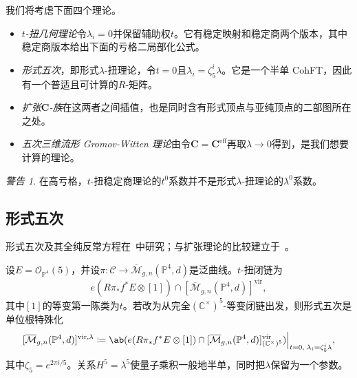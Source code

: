 \documentclass{amsart}
\theoremstyle{definition}
\theoremstyle{remark}
\newtheorem{warn}[thm]{警告}
\theoremstyle{plain}
\theoremstyle{definition}
\theoremstyle{remark}
\newcommand{\C}{\mathbb{C}}
\renewcommand{\P}{\mathbb{P}}
\newcommand{\Mbar}{\overline{\mathcal{M}}}
\newcommand{\mc}[1]{\mathcal{#1}}
\newcommand{\mbf}[1]{\mathbf{#1}}
\newcommand{\mr}[1]{\mathrm{#1}}
\newcommand{\1}{\mathbf{1}}
\newcommand{\2}{\mathbf{2}}
\newcommand{\3}{\mathbf{3}}
\newcommand{\vir}{\mr{vir}}
\begin{document}
我们将考虑下面四个理论。
\begin{itemize}
    \item \textit{\(t\)-扭几何理论}令\(\lambda_i = 0\)并保留辅助权\(t\)。它有稳定映射和稳定商两个版本，其中稳定商版本给出下面的亏格二局部化公式。
    \item \textit{形式五次}，即形式\(\lambda\)-扭理论，令\(t = 0\)且\(\lambda_i = \zeta_5^i \lambda\)。它是一个半单 CohFT，因此有一个普适且可计算的\(R\)-矩阵。
    \item \textit{扩张\(\mbf{C}\)-族}在这两者之间插值，也是同时含有形式顶点与亚纯顶点的二部图所在之处。
    \item \textit{五次三维流形 Gromov-Witten 理论}由令\(\mbf{C} = \mbf{C}^{\mr{eff}}\)再取\(\lambda \to 0\)得到，是我们想要计算的理论。
\end{itemize}

\begin{warn}
    在高亏格，\(t\)-扭稳定商理论的\(t^0\)系数并不是形式\(\lambda\)-扭理论的\(\lambda^0\)系数。
\end{warn}

\subsection{形式五次}%
\label{sub:The formal quintic}

形式五次及其全纯反常方程在~\cite{LhoPandharipande2019}中研究；与扩张理论的比较建立于~\cite{GJRstructure}。

设\(E = \mc{O}_{\P^4}(5)\)，并设\(\pi \colon \mc{C} \to \Mbar_{g,n}(\P^4,d)\)是泛曲线。\(t\)-扭闭链为
\[ e(R\pi_* f^* E \otimes [1]) \cap [\Mbar_{g,n}(\P^4,d)]^{\vir}, \]
其中\([1]\)的等变第一陈类为\(t\)。若改为从完全\((\C^{\times})^5\)-等变闭链出发，则形式五次是单位根特殊化
\[ [\Mbar_{g,n}(\P^4,d)]^{\vir,\lambda} \coloneqq \ab( e(R\pi_*f^*E \otimes [1]) \cap [\Mbar_{g,n}(\P^4,d)]^{\vir}_{(\C^{\times})^5})\Big|_{t=0, \; \lambda_i = \zeta_5^i \lambda}, \]
其中\(\zeta_5 = e^{2\pi i/5}\)。关系\(H^5 = \lambda^5\)使量子乘积一般地半单，同时把\(\lambda\)保留为一个参数。
\end{document}
